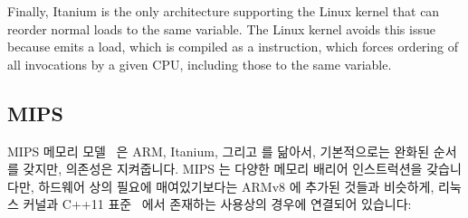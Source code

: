 Finally, Itanium is the only architecture supporting the Linux kernel
that can reorder normal loads to the same variable.
The Linux kernel avoids this issue because  emits
a  load, which is compiled as a  instruction,
which forces ordering of all  invocations by a given
CPU, including those to the same variable.

\subsection{MIPS}

MIPS 메모리 모델~\cite[page~479]{MIPSvII-A-2017} 은 ARM, Itanium, 그리고
\Power{} 를 닮아서, 기본적으로는 완화된 순서를 갖지만, 의존성은 지켜줍니다.
MIPS 는 다양한 메모리 배리어 인스트럭션을 갖습니다만, 하드웨어 상의 필요에
매여있기보다는 ARMv8 에 추가된 것들과 비슷하게, 리눅스 커널과 C++11
표준~\cite{RichardSmith2015N4527} 에서 존재하는 사용상의 경우에 연결되어
있습니다:

